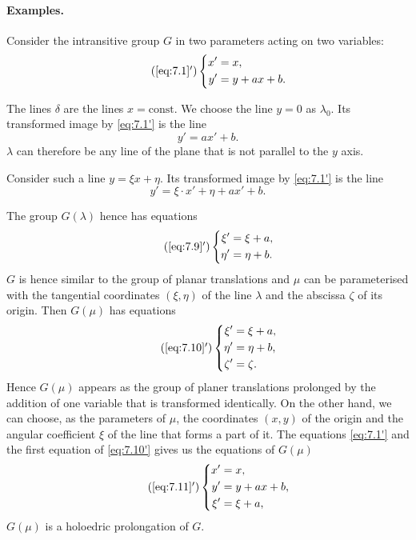 \documentclass[leqno,11pt]{book}
\numberwithin{equation}{chapter}
\theoremstyle{shape1}
\theoremstyle{shapesmall}
\begin{document}
\paragraph{Examples.}
\label{sec:104}
{\small
Consider the intransitive group $G$ in two parameters acting on two variables:
\begin{equation}
  \label{eq:7.1'}\tag{\ref{eq:7.1}$'$}
  \left\{
    \begin{aligned}
      x'&=x,\\
      y'&=y+ax+b.
    \end{aligned}
  \right.
\end{equation}

The lines $\delta$ are the lines $x=\text{const}$. We choose the line $y=0$ as $\lambda_{0}$. Its transformed image by \eqref{eq:7.1'} is the line
\[
y'=ax'+b.
\]
$\lambda$ can therefore be any line of the plane that is not parallel to the $y$ axis.

Consider such a line $y=\xi x+\eta$. Its transformed image by \eqref{eq:7.1'} is the line
\[
y'=\xi\cdot x'+\eta+a x'+b.
\]

The group $G(\lambda)$ hence has equations
\begin{equation}
  \label{eq:7.9'}\tag{\ref{eq:7.9}$'$}
  \left\{
    \begin{aligned}
      \xi'&=\xi+a,\\
      \eta'&=\eta+b.
    \end{aligned}
  \right.
\end{equation}
$G$ is hence similar to the group of planar translations and $\mu$ can be parameterised with the tangential coordinates $(\xi, \eta)$ of the line $\lambda$ and the abscissa $\zeta$ of its origin. Then $G(\mu)$ has equations
\begin{equation}
  \label{eq:7.10'}\tag{\ref{eq:7.10}$'$}
  \left\{
    \begin{aligned}
      \xi'&=\xi+a,\\
      \eta'&=\eta+b,\\
      \zeta'&=\zeta.
    \end{aligned}
  \right.
\end{equation}
Hence $G(\mu)$ appears as the group of planer translations prolonged by the addition of one variable that is transformed identically. On the other hand, we can choose, as the parameters of $\mu$, the coordinates $(x,y)$ of the origin and the angular coefficient $\xi$ of the line that forms a part of it. The equations \eqref{eq:7.1'} and the first equation of \eqref{eq:7.10'} gives us the equations of $G(\mu)$
\begin{equation}
  \label{eq:7.11'}\tag{\ref{eq:7.11}$'$}
  \left\{
    \begin{aligned}
      x'&=x,\\
      y'&=y+ax+b,\\
      \xi'&=\xi+a,
    \end{aligned}
  \right.
\end{equation}
$G(\mu)$ is a holoedric prolongation of $G$.

}
\end{document}
